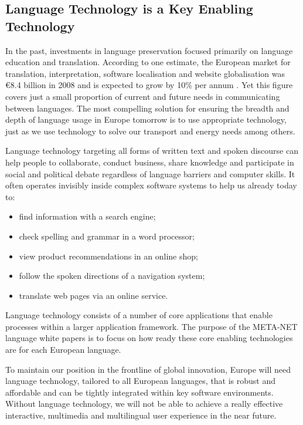 \begin{multicols}{2}
\subsection{Language Technology is a Key Enabling Technology}

In the past, investments in language preservation focused primarily on language education and translation. According to one estimate, the European market for translation, interpretation, software localisation and website globalisation was €8.4 billion in 2008 and is expected to grow by 10\% per annum \cite{EC3}. Yet this figure covers just a small proportion of current and future needs in communicating between languages. The most compelling solution for ensuring the breadth and depth of language usage in Europe tomorrow is to use appropriate technology, just as we use technology to solve our transport and energy needs among others.

Language technology targeting all forms of written text and spoken discourse can help people to collaborate, conduct business, share knowledge and participate in social and political debate regardless of language barriers and computer skills. It often operates invisibly inside complex software systems to help us already today to:

\begin{itemize}
\item find information with a search engine;
\item check spelling and grammar in a word processor;
\item view product recommendations in an online shop;
\item follow the spoken directions of a navigation system;
\item translate web pages via an online service.
\end{itemize}

Language technology consists of a number of core applications that enable processes within a larger application framework. The purpose of the META-NET language white papers is to focus on how ready these core enabling technologies are for each European language. 


To maintain our position in the frontline of global innovation, Europe will need language technology, tailored to all European languages, that is robust and affordable and can be tightly integrated within key software environments. Without language technology, we will not be able to achieve a really effective interactive, multimedia and multilingual user experience in the near future.


\end{multicols}

